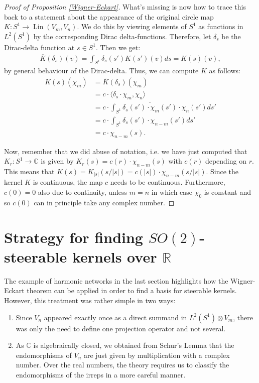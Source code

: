 \documentclass[12pt, a4paper]{article}
\theoremstyle{plain}
\theoremstyle{definition}
\theoremstyle{remark}
\newcommand{\R}{\mathds{R}}
\newcommand{\C}{\mathds{C}}
\DeclareMathOperator{\lin}{Lin}
\begin{document}
\begin{proof}[Proof of Proposition \ref{Wigner-Eckart}]
What's missing is now how to trace this back to a statement about the appearance of the original circle map $K: S^1 \to \lin(V_m, V_n)$. We do this by viewing elements of $S^1$ as functions in $L^2(S^1)$ by the corresponding Dirac delta-functions. Therefore, let $\delta_s$ be the Dirac-delta function at $s \in S^1$. Then we get:
\begin{align*}
\overline{K}(\delta_s)(v) = \int_{S^1} \delta_s(s') K(s')(v)ds = K(s)(v),
\end{align*}
by general behaviour of the Dirac-delta. Thus, we can compute $K$ as follows:
\begin{align*}
K(s)(\chi_m) & = \overline{K}(\delta_s)(\chi_m) \\
& = c \cdot \langle \delta_s \cdot \chi_m , \chi_n \rangle \\
& = c \cdot \int_{S^1} \overline{\delta_s(s')\cdot \chi_m(s')} \cdot \chi_n(s') ds' \\
& = c \cdot \int_{S^1} \delta_s(s') \cdot \chi_{n-m}(s') ds' \\
& = c \cdot \chi_{n - m}(s).
\end{align*}

Now, remember that we did abuse of notation, i.e. we have just computed that $K_r: S^1 \to \C$ is given by $K_r(s) = c(r) \cdot \chi_{n-m}(s)$ with $c(r)$ depending on $r$. This means that $K(s) = K_{|s|}(s/|s|) = c(|s|) \cdot \chi_{n-m}(s/|s|)$. Since the kernel $K$ is continuous, the map $c$ needs to be continuous. Furthermore, $c(0) = 0$ also due to continuity, unless $m = n$ in which case $\chi_0$ is constant and so $c(0)$ can in principle take any complex number.

\end{proof}

\section{Strategy for finding $SO(2)$-steerable kernels over $\R$}

The example of harmonic networks in the last section highlights how the Wigner-Eckart theorem can be applied in order to find a basis for steerable kernels. However, this treatment was rather simple in two ways:

\begin{enumerate}
\item Since $V_n$ appeared exactly once as a direct summand in $L^2(S^1) \otimes V_m$, there was only the need to define one projection operator and not several.
\item As $\C$ is algebraically closed, we obtained from Schur's Lemma that the endomorphisms of $V_n$ are just given by multiplication with a complex number. Over the real numbers, the theory requires us to classify the endomorphisms of the irreps in a more careful manner.
\end{enumerate}
\end{document}
